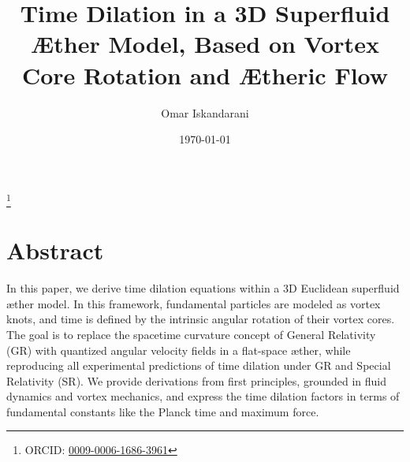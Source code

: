 \documentclass[a4paper,12pt]{revtex4}
\begin{document}
\author{Omar Iskandarani}
\title{Time Dilation in a 3D Superfluid Æther Model, Based on Vortex Core Rotation and Ætheric Flow}
\date{\today}
\thanks{ORCID: \href{https://orcid.org/0009-0006-1686-3961}{0009-0006-1686-3961}}

\maketitle

\section*{Abstract}
In this paper, we derive time dilation equations within a 3D Euclidean superfluid æther model. In this framework, fundamental particles are modeled as vortex knots, and time is defined by the intrinsic angular rotation of their vortex cores. The goal is to replace the spacetime curvature concept of General Relativity (GR) with quantized angular velocity fields in a flat-space æther, while reproducing all experimental predictions of time dilation under GR and Special Relativity (SR). We provide derivations from first principles, grounded in fluid dynamics and vortex mechanics, and express the time dilation factors in terms of fundamental constants like the Planck time and maximum force.











\end{document}
